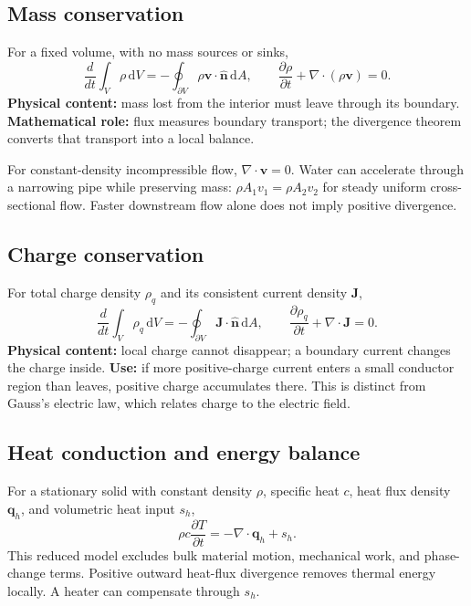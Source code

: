 \documentclass[11pt,letterpaper]{article}
\newcommand{\vect}[1]{\boldsymbol{#1}}
\newcommand{\dd}{\,\mathrm d}
\begin{document}
\subsection*{Mass conservation}
For a fixed volume, with no mass sources or sinks,
\begin{equation}
\frac{d}{dt}\int_V\rho\dd V
=-\oint_{\partial V}\rho\vect v\cdot\hat{\vect n}\dd A,
\qquad
\frac{\partial\rho}{\partial t}+\nabla\cdot(\rho\vect v)=0.
\end{equation}
\textbf{Physical content:} mass lost from the interior must leave through its boundary. \textbf{Mathematical role:} flux measures boundary transport; the divergence theorem converts that transport into a local balance.

For constant-density incompressible flow, $\nabla\cdot\vect v=0$. Water can accelerate through a narrowing pipe while preserving mass: $\rho A_1v_1=\rho A_2v_2$ for steady uniform cross-sectional flow. Faster downstream flow alone does not imply positive divergence.

\subsection*{Charge conservation}
For total charge density $\rho_q$ and its consistent current density $\vect J$,
\begin{equation}
\frac{d}{dt}\int_V\rho_q\dd V
=-\oint_{\partial V}\vect J\cdot\hat{\vect n}\dd A,
\qquad
\frac{\partial\rho_q}{\partial t}+\nabla\cdot\vect J=0.
\end{equation}
\textbf{Physical content:} local charge cannot disappear; a boundary current changes the charge inside. \textbf{Use:} if more positive-charge current enters a small conductor region than leaves, positive charge accumulates there. This is distinct from Gauss's electric law, which relates charge to the electric field.

\subsection*{Heat conduction and energy balance}
For a stationary solid with constant density $\rho$, specific heat $c$, heat flux density $\vect q_h$, and volumetric heat input $s_h$,
\begin{equation}
\rho c\frac{\partial T}{\partial t}=-\nabla\cdot\vect q_h+s_h.
\end{equation}
This reduced model excludes bulk material motion, mechanical work, and phase-change terms. Positive outward heat-flux divergence removes thermal energy locally. A heater can compensate through $s_h$.
\end{document}
